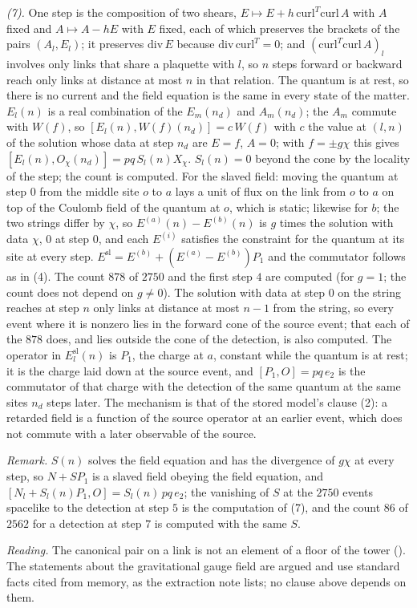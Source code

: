 \emph{(7).} One step is the composition of two shears, $E \mapsto E + h\,\mathrm{curl}^{T}\mathrm{curl}\,A$ with $A$ fixed and $A \mapsto A - hE$ with $E$ fixed, each of which preserves the brackets of the pairs $(A_{l}, E_{l})$; it preserves $\mathrm{div}\,E$ because $\mathrm{div}\,\mathrm{curl}^{T} = 0$; and $(\mathrm{curl}^{T}\mathrm{curl}\,A)_{l}$ involves only links that share a plaquette with $l$, so $n$ steps forward or backward reach only links at distance at most $n$ in that relation. The quantum is at rest, so there is no current and the field equation is the same in every state of the matter. $E_{l}(n)$ is a real combination of the $E_{m}(n_{d})$ and $A_{m}(n_{d})$; the $A_{m}$ commute with $W(f)$, so $[E_{l}(n), W(f)(n_{d})] = c\,W(f)$ with $c$ the value at $(l, n)$ of the solution whose data at step $n_{d}$ are $E = f$, $A = 0$; with $f = \pm g\chi$ this gives $[E_{l}(n), O_{\chi}(n_{d})] = pq\,S_{l}(n)X_{\chi}$. $S_{l}(n) = 0$ beyond the cone by the locality of the step; the count is computed. For the slaved field: moving the quantum at step $0$ from the middle site $o$ to $a$ lays a unit of flux on the link from $o$ to $a$ on top of the Coulomb field of the quantum at $o$, which is static; likewise for $b$; the two strings differ by $\chi$, so $E^{(a)}(n) - E^{(b)}(n)$ is $g$ times the solution with data $\chi$, $0$ at step $0$, and each $E^{(i)}$ satisfies the constraint for the quantum at its site at every step. $E^{\mathrm{sl}} = E^{(b)} + (E^{(a)} - E^{(b)})P_{1}$ and the commutator follows as in (4). The count $878$ of $2750$ and the first step $4$ are computed (for $g = 1$; the count does not depend on $g \neq 0$). The solution with data at step $0$ on the string reaches at step $n$ only links at distance at most $n - 1$ from the string, so every event where it is nonzero lies in the forward cone of the source event; that each of the $878$ does, and lies outside the cone of the detection, is also computed. The operator in $E^{\mathrm{sl}}_{l}(n)$ is $P_{1}$, the charge at $a$, constant while the quantum is at rest; it is the charge laid down at the source event, and $[P_{1}, O] = pq\,e_{2}$ is the commutator of that charge with the detection of the same quantum at the same sites $n_{d}$ steps later. The mechanism is that of the stored model's clause (2): a retarded field is a function of the source operator at an earlier event, which does not commute with a later observable of the source.

\emph{Remark.} $S(n)$ solves the field equation and has the divergence of $g\chi$ at every step, so $N + SP_{1}$ is a slaved field obeying the field equation, and $[N_{l} + S_{l}(n)P_{1}, O] = S_{l}(n)\,pq\,e_{2}$; the vanishing of $S$ at the $2750$ events spacelike to the detection at step $5$ is the computation of (7), and the count $86$ of $2562$ for a detection at step $7$ is computed with the same $S$.

\emph{Reading.} The canonical pair on a link is not an element of a floor of the tower (). The statements about the gravitational gauge field are argued and use standard facts cited from memory, as the extraction note lists; no clause above depends on them.
